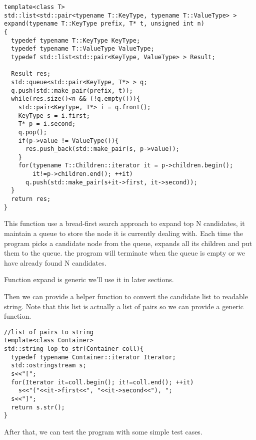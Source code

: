 \documentclass{article}
\begin{document}
\begin{lstlisting}
template<class T>
std::list<std::pair<typename T::KeyType, typename T::ValueType> >
expand(typename T::KeyType prefix, T* t, unsigned int n)
{
  typedef typename T::KeyType KeyType;
  typedef typename T::ValueType ValueType;
  typedef std::list<std::pair<KeyType, ValueType> > Result;

  Result res;
  std::queue<std::pair<KeyType, T*> > q;
  q.push(std::make_pair(prefix, t));
  while(res.size()<n && (!q.empty())){
    std::pair<KeyType, T*> i = q.front();
    KeyType s = i.first;
    T* p = i.second;
    q.pop();
    if(p->value != ValueType()){
      res.push_back(std::make_pair(s, p->value));
    }
    for(typename T::Children::iterator it = p->children.begin();
        it!=p->children.end(); ++it)
      q.push(std::make_pair(s+it->first, it->second));
  }
  return res;
}
\end{lstlisting}

This function use a bread-first search approach to expand top N
candidates, it maintain a queue to store the node it is currently
dealing with. Each time the program picks a candidate node from the
queue, expands all its children and put them to the queue. the program
will terminate when the queue is empty or we have already found N
candidates. 

Function expand is generic we'll use it in later sections.

Then we can provide a helper function to convert the candidate
list to readable string. Note that this list is actually a list of pairs so we can
provide a generic function.

\begin{lstlisting}
//list of pairs to string
template<class Container>
std::string lop_to_str(Container coll){
  typedef typename Container::iterator Iterator;
  std::ostringstream s;
  s<<"[";
  for(Iterator it=coll.begin(); it!=coll.end(); ++it)
    s<<"("<<it->first<<", "<<it->second<<"), ";
  s<<"]";
  return s.str();
}
\end{lstlisting}

After that, we can test the program with some simple test cases.
\end{document}
